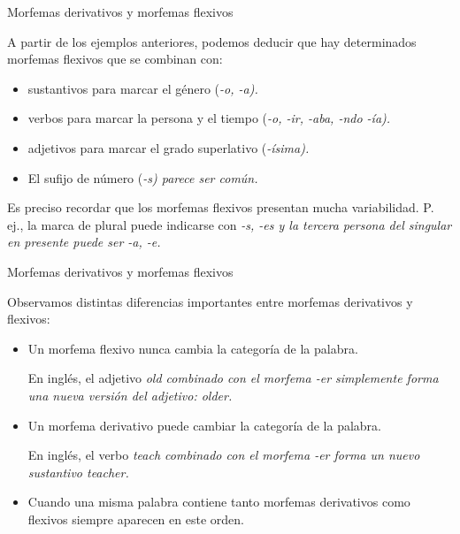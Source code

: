 \documentclass{beamer}
\begin{document}
\begin{frame}{Morfemas derivativos y morfemas flexivos}

A partir de los ejemplos anteriores, podemos deducir que hay determinados morfemas flexivos que se combinan con:

\begin{itemize}
	\item sustantivos para marcar el género (\it{-o, -a}).
	\item verbos para marcar la persona y el tiempo (\it{-o, -ir, -aba, -ndo -ía}).
	\item adjetivos para marcar el grado superlativo (\it{-ísima}).
	\item El sufijo de número (\it{-s}) parece ser común.
\end{itemize}
	
Es preciso recordar que los morfemas flexivos presentan mucha variabilidad. P. ej., la marca de plural puede indicarse con \it{-s, -es} y la tercera persona del singular en presente puede ser \it{-a, -e}.
\end{frame}

\begin{frame}{Morfemas derivativos y morfemas flexivos}

Observamos distintas diferencias importantes entre morfemas derivativos y flexivos:

\begin{itemize}
	\item Un morfema flexivo nunca cambia la categoría de la palabra.
	
	En inglés, el adjetivo \it{old} combinado con el morfema \it{-er} simplemente forma una nueva versión del adjetivo: \it{older}.
	 
	\item Un morfema derivativo puede cambiar la categoría de la palabra. 
	
	En inglés, el verbo \it{teach} combinado con el morfema \it{-er} forma un nuevo sustantivo \it{teacher}.
	

	\item Cuando una misma palabra contiene tanto morfemas derivativos como flexivos siempre aparecen en este orden.
\end{itemize}
	
\end{frame}
\end{document}
